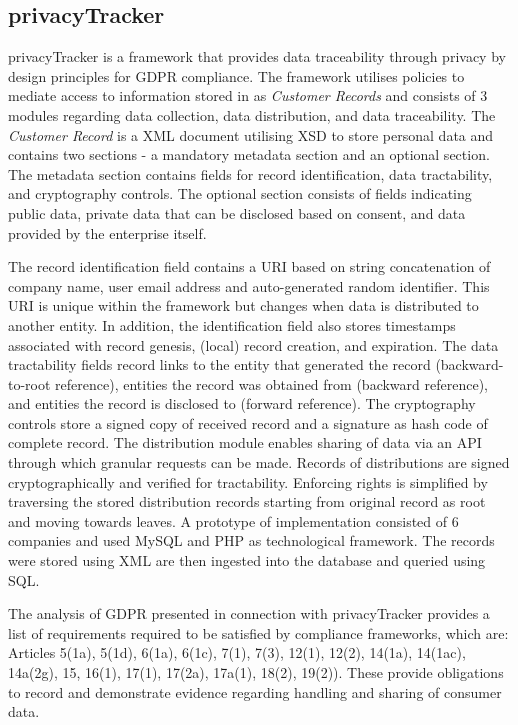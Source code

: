 \subsection*{privacyTracker}
privacyTracker \cite{gjermundrod_privacytracker_2016} is a framework that provides data traceability through privacy by design principles for GDPR compliance. The framework utilises policies to mediate access to information stored in as \textit{Customer Records} and consists of 3 modules regarding data collection, data distribution, and data traceability. The \textit{Customer Record} is a XML document utilising XSD to store personal data and contains two sections - a mandatory metadata section and an optional section. The metadata section contains fields for record identification, data tractability, and cryptography controls. The optional section consists of fields indicating public data, private data that can be disclosed based on consent, and data provided by the enterprise itself.

The record identification field contains a URI based on string concatenation of company name, user email address and auto-generated random identifier. This URI is unique within the framework but changes when data is distributed to another entity. In addition, the identification field also stores timestamps associated with record genesis, (local) record creation, and expiration. The data tractability fields record links to the entity that generated the record (backward-to-root reference), entities the record was obtained from (backward reference), and entities the record is disclosed to (forward reference). The cryptography controls store a signed copy of received record and a signature as hash code of complete record.
The distribution module enables sharing of data via an API through which granular requests can be made. Records of distributions are signed cryptographically and verified for tractability.
Enforcing rights is simplified by traversing the stored distribution records starting from original record as root and moving towards leaves.
A prototype of implementation consisted of 6 companies and used MySQL and PHP as technological framework. The records were stored using XML are then ingested into the database and queried using SQL.

The analysis of GDPR presented in connection with privacyTracker provides a list of requirements required to be satisfied by compliance frameworks, which are: Articles 5(1a), 5(1d), 6(1a), 6(1c), 7(1), 7(3), 12(1), 12(2), 14(1a), 14(1ac), 14a(2g), 15, 16(1), 17(1), 17(2a), 17a(1), 18(2), 19(2)). These provide obligations to record and demonstrate evidence regarding handling and sharing of consumer data. 

